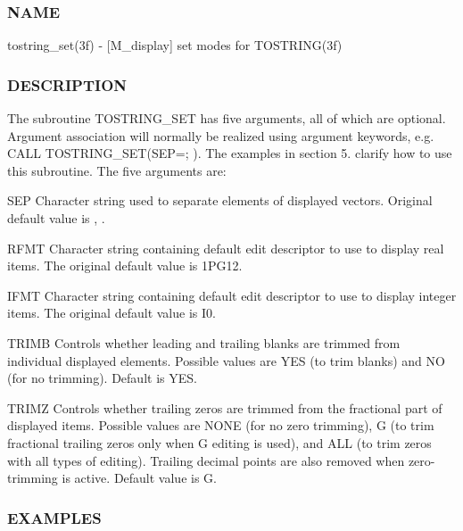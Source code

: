 \subsubsection*{N\+A\+ME}

tostring\+\_\+set(3f) -\/ \mbox{[}M\+\_\+display\mbox{]} set modes for T\+O\+S\+T\+R\+I\+N\+G(3f) 

\subsubsection*{D\+E\+S\+C\+R\+I\+P\+T\+I\+ON}

The subroutine T\+O\+S\+T\+R\+I\+N\+G\+\_\+\+S\+ET has five arguments, all of which are optional. Argument association will normally be realized using argument keywords, e.\+g. C\+A\+LL T\+O\+S\+T\+R\+I\+N\+G\+\_\+\+S\+ET(S\+EP=\textquotesingle{}; \textquotesingle{}). The examples in section 5. clarify how to use this subroutine. The five arguments are\+:

S\+EP Character string used to separate elements of displayed vectors. Original default value is \textquotesingle{}, \textquotesingle{}.

R\+F\+MT Character string containing default edit descriptor to use to display real items. The original default value is \textquotesingle{}1\+P\+G12.\textquotesingle{}

I\+F\+MT Character string containing default edit descriptor to use to display integer items. The original default value is \textquotesingle{}I0\textquotesingle{}.

T\+R\+I\+MB Controls whether leading and trailing blanks are trimmed from individual displayed elements. Possible values are \textquotesingle{}Y\+ES\textquotesingle{} (to trim blanks) and \textquotesingle{}NO\textquotesingle{} (for no trimming). Default is \textquotesingle{}Y\+ES\textquotesingle{}.

T\+R\+I\+MZ Controls whether trailing zeros are trimmed from the fractional part of displayed items. Possible values are \textquotesingle{}N\+O\+NE\textquotesingle{} (for no zero trimming), \textquotesingle{}G\textquotesingle{} (to trim fractional trailing zeros only when G editing is used), and \textquotesingle{}A\+LL\textquotesingle{} (to trim zeros with all types of editing). Trailing decimal points are also removed when zero-\/trimming is active. Default value is \textquotesingle{}G\textquotesingle{}.

\subsubsection*{E\+X\+A\+M\+P\+L\+ES}

